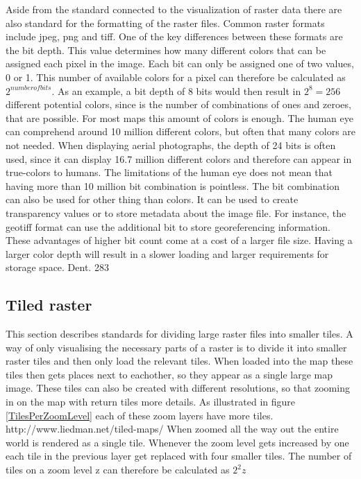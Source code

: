 Aside from the standard connected to the visualization of raster data there are also standard for the formatting of the raster files. Common raster formats include jpeg, png and tiff. One of the key differences between these formats are the bit depth. This value determines how many different colors that can be assigned each pixel in the image. Each bit can only be assigned one of two values, 0 or 1. This number of available colors for a pixel can therefore be calculated as $2^{number of bits}$. As an example, a bit depth of 8 bits would then result in $2^8 = 256$ different potential colors, since is the number of combinations of ones and zeroes, that are possible. For most maps this amount of colors is enough. The human eye can comprehend around 10 million different colors, but often that many colors are not needed. When displaying aerial photographs, the depth of 24 bits is often used, since it can display 16.7 million different colors and therefore can appear in true-colors to humans.
The limitations of the human eye does not mean that having more than 10 million bit combination is pointless. The bit combination can also be used for other thing than colors. It can be used to create transparency values or to store metadata about the image file. For instance, the geotiff format can use the additional bit to store georeferencing information.
These advantages of higher bit count come at a cost of a larger file size. Having a larger color depth will result in a slower loading and larger requirements for storage space.
Dent. 283 
\subsection{Tiled raster}
This section describes standards for dividing large raster files into smaller tiles. 
A way of only visualising the necessary parts of a raster is to divide it into smaller raster tiles and then only load the relevant tiles. When loaded into the map these tiles then gets places next to eachother, so they appear as a single large map image. These tiles can also be created with different resolutions, so that zooming in on the map with return tiles more details.  As illustrated in figure \ref{TilesPerZoomLevel} each of these zoom layers have more tiles.
http://www.liedman.net/tiled-maps/
When zoomed all the way out the entire world is rendered as a single tile. Whenever the zoom level gets increased by one each tile in the previous layer get replaced with four smaller tiles. The number of tiles on a zoom level z can therefore be calculated as $2^2z$


